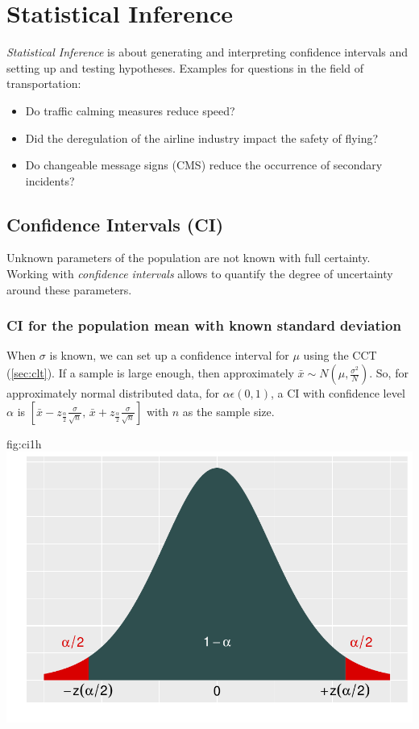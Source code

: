 \section{Statistical Inference}
	\emph{Statistical Inference} is about generating and interpreting confidence intervals and setting up and testing hypotheses. Examples for questions in the field of transportation:
	\begin{itemize}
		\item Do traffic calming measures reduce speed?
		\item Did the deregulation of the airline industry impact the safety of flying?
		\item Do changeable message signs (CMS) reduce the occurrence of secondary incidents?
	\end{itemize}
\subsection{Confidence Intervals (CI)}
	Unknown parameters of the population are not known with full certainty. Working with \emph{confidence intervals} allows to quantify the degree of uncertainty around these parameters.
	\subsubsection{CI for the population mean with known standard deviation}
		When $\sigma$ is known, we can set up a confidence interval for $\mu$ using the CCT (\ref{sec:clt}). If a sample is large enough, then approximately $\bar{x}\sim N(\mu,\frac{\sigma^2}{N})$. So, for approximately normal distributed data, for $\alpha\epsilon(0,1)$, a CI with confidence level $\alpha$ is $\left[\bar{x}-z_{\frac{\alpha}{2}}\frac{\sigma}{\sqrt{n}},\,\bar{x}+z_{\frac{\alpha}{2}}\frac{\sigma}{\sqrt{n}}\right]$ with $n$ as the sample size.
		\begin{fig}{fig:ci1}{h}
			\includegraphics[width=\textwidth]{P11ci.pdf}	
		\end{fig}
